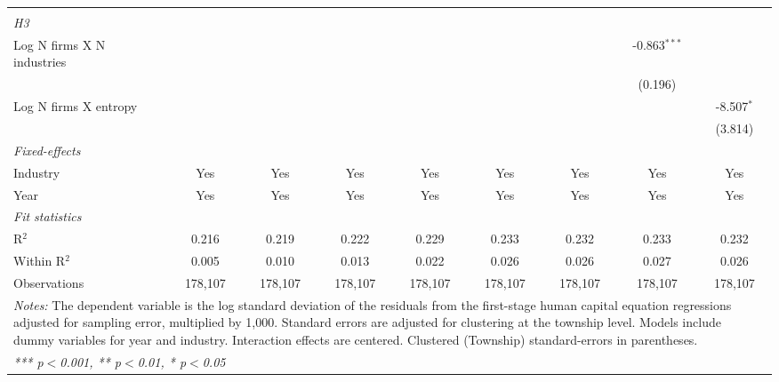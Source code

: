 \begin{tabular}{lcccccccc}
\hdashline %
\\[0.1ex] %
\emph{H3} \\ 
   Log N firms X N industries                            &                  &                 &                  &                  &                  &                  & -0.863$^{***}$   &   \\   
                                                         &                  &                 &                  &                  &                  &                  & (0.196)          &   \\   
   Log N firms X entropy                                 &                  &                 &                  &                  &                  &                  &                  & -8.507$^{*}$\\   
                                                         &                  &                 &                  &                  &                  &                  &                  & (3.814)\\   
   \midrule
   \emph{Fixed-effects}\\
   Industry                                              & Yes              & Yes             & Yes              & Yes              & Yes              & Yes              & Yes              & Yes\\  
   Year                                                  & Yes              & Yes             & Yes              & Yes              & Yes              & Yes              & Yes              & Yes\\  
   \midrule
   \emph{Fit statistics}\\
   R$^2$                                                 & 0.216            & 0.219           & 0.222            & 0.229            & 0.233            & 0.232            & 0.233            & 0.232\\  
   Within R$^2$                                          & 0.005            & 0.010           & 0.013            & 0.022            & 0.026            & 0.026            & 0.027            & 0.026\\  
   Observations                                          & 178,107          & 178,107         & 178,107          & 178,107          & 178,107          & 178,107          & 178,107          & 178,107\\  
   \midrule \midrule
\multicolumn{9}{p{24cm}}{\emph{Notes:} The dependent variable is the log 
    standard deviation of the residuals from the first-stage human capital equation 
    regressions adjusted for sampling error, multiplied by 1,000. Standard errors 
    are adjusted for clustering at the township level. Models include dummy variables 
    for year and industry. Interaction effects are centered. Clustered (Township) 
    standard-errors in parentheses.}\\
\multicolumn{9}{l}{\emph{*** p$<$0.001, ** p$<$0.01, * p$<$0.05}} \\ 
\end{tabular}
\par\endgroup

